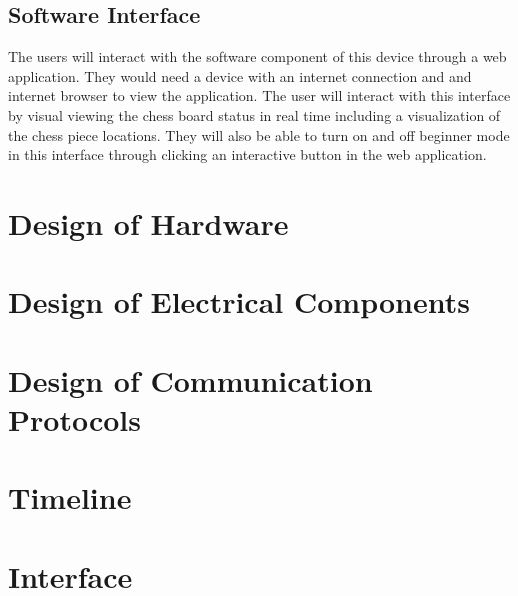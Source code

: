 \documentclass[12pt, titlepage]{article}
\begin{document}
\subsection*{Software Interface}
The users will interact with the software component of this device through a web application. They would need a device with an internet connection and and internet browser
to view the application. The user will interact with this interface by visual viewing the chess board status in real time including a visualization of the chess piece locations.
They will also be able to turn on and off beginner mode in this interface through clicking an interactive button in the web application. 

\section{Design of Hardware}


\section{Design of Electrical Components}


\section{Design of Communication Protocols}


\section{Timeline}


% 

\newpage{}

\appendix

\section{Interface}
\end{document}
